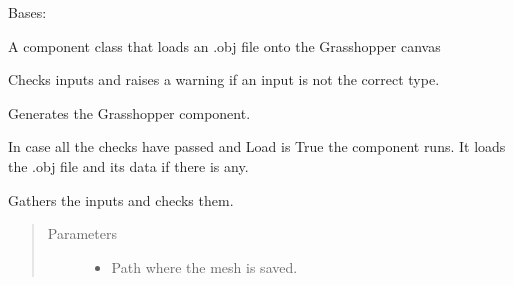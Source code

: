 \documentclass[letterpaper,10pt,english]{sphinxmanual}
\begin{document}
\begin{fulllineitems}
\label{\detokenize{geometry:livestock.components.geometry.LoadMesh}}
Bases: {\hyperref[\detokenize{superclass:livestock.components.component.GHComponent}]{}}

A component class that loads an .obj file onto the Grasshopper canvas

\begin{fulllineitems}
\label{\detokenize{geometry:livestock.components.geometry.LoadMesh.check_inputs}}
Checks inputs and raises a warning if an input is not the correct type.

\end{fulllineitems}


\begin{fulllineitems}
\label{\detokenize{geometry:livestock.components.geometry.LoadMesh.config}}
Generates the Grasshopper component.

\end{fulllineitems}


\begin{fulllineitems}
\label{\detokenize{geometry:livestock.components.geometry.LoadMesh.run}}
In case all the checks have passed and Load is True the component runs.
It loads the .obj file and its data if there is any.

\end{fulllineitems}


\begin{fulllineitems}
\label{\detokenize{geometry:livestock.components.geometry.LoadMesh.run_checks}}
Gathers the inputs and checks them.
\begin{quote}\begin{description}
\item[{Parameters}] \leavevmode\begin{itemize}
\item {} 
 \textendash{} Path where the mesh is saved.


\end{itemize}
\end{description}
\end{quote}
\end{fulllineitems}
\end{fulllineitems}
\end{document}
